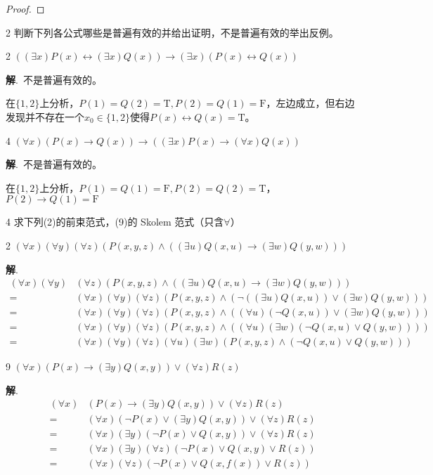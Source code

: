 \documentclass[12pt]{article}
\newenvironment{firstlayer}%
{\begin{list}{}{\renewcommand{\makelabel}[1]{\textbf{##1}.\hfil}
}}
{\end{list}}
\newenvironment{secondlayer}%
{\begin{list}{}{\renewcommand{\makelabel}[1]{(##1)\hfil}
}}
{\end{list}}
\providecommand{\sol}{\textbf{解}.~}
\begin{document}
\begin{CJK}{UTF8}{gbsn}
\begin{firstlayer}
\begin{secondlayer}
\begin{proof}
    \end{proof}
  \end{secondlayer}
  \item[2]判断下列各公式哪些是普遍有效的并给出证明，不是普遍有效的举出反例。
  \begin{secondlayer}
    \item[2]$((\exists x)P(x)\leftrightarrow (\exists x)Q(x))\rightarrow (\exists x)(P(x)\leftrightarrow Q(x))$
    
    \sol 不是普遍有效的。

在$\{1,2\}$上分析，$P(1)=Q(2)=\text{T},P(2)=Q(1)=\text{F}$，左边成立，但右边发现并不存在一个$x_0\in\{1,2\}$使得$P(x)\leftrightarrow Q(x)=\text{T}$。
    \item[4]$(\forall x)(P(x)\rightarrow Q(x))\rightarrow((\exists x)P(x)\rightarrow (\forall x)Q(x))$
    
    \sol 不是普遍有效的。

在$\{1,2\}$上分析，$P(1)=Q(1)=\text{F},P(2)=Q(2)=\text{T}$，$P(2)\rightarrow Q(1)=\text{F}$
  \end{secondlayer}
  \item[4]求下列(2)的前束范式，(9)的 Skolem 范式（只含$\forall$）
  \begin{secondlayer}
    \item[2]$(\forall x)(\forall y)(\forall z)(P(x,y,z)\wedge ((\exists u)Q(x,u)\rightarrow (\exists w)Q(y,w)))$
    
    \sol 
    \begin{align*}
      (\forall x)(\forall y)&(\forall z)(P(x,y,z)\wedge ((\exists u)Q(x,u)\rightarrow (\exists w)Q(y,w)))\\
      =&(\forall x)(\forall y)(\forall z)(P(x,y,z)\wedge (\neg ((\exists u)Q(x,u))\vee (\exists w)Q(y,w)))\\
      =&(\forall x)(\forall y)(\forall z)(P(x,y,z)\wedge ((\forall u)(\neg Q(x,u))\vee (\exists w)Q(y,w)))\\
      =&(\forall x)(\forall y)(\forall z)(P(x,y,z)\wedge ((\forall u)(\exists w)(\neg Q(x,u)\vee Q(y,w))))\\
      =&(\forall x)(\forall y)(\forall z)(\forall u)(\exists w)(P(x,y,z)\wedge (\neg Q(x,u)\vee Q(y,w)))
      \end{align*}
    \item[9] $(\forall x)(P(x)\rightarrow (\exists y)Q(x,y))\vee (\forall z)R(z)$
    
    
    
    \sol 
    \begin{align*}
      (\forall x)&(P(x)\rightarrow (\exists y)Q(x,y))\vee (\forall z)R(z)\\
      =&(\forall x)(\neg P(x)\vee (\exists y)Q(x,y))\vee (\forall z)R(z)\\
      =&(\forall x)(\exists y)(\neg P(x)\vee Q(x,y))\vee (\forall z)R(z)\\
      =&(\forall x)(\exists y)(\forall z)(\neg P(x)\vee Q(x,y)\vee R(z))\\
      =&(\forall x)(\forall z)(\neg P(x)\vee Q(x,f(x))\vee R(z))
    \end{align*}
    

\end{secondlayer}
\end{firstlayer}
\end{CJK}
\end{document}
